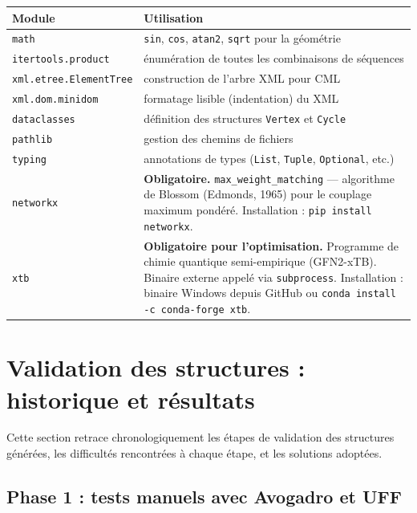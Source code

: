 \documentclass[a4paper,12pt]{article}
\begin{document}
\begin{center}
\begin{tabular}{lp{9cm}}
  \toprule
  Module & Utilisation \\
  \midrule
  \texttt{math} & \texttt{sin}, \texttt{cos}, \texttt{atan2}, \texttt{sqrt} pour la géométrie \\
  \texttt{itertools.product} & énumération de toutes les combinaisons de séquences \\
  \texttt{xml.etree.ElementTree} & construction de l'arbre XML pour CML \\
  \texttt{xml.dom.minidom} & formatage lisible (indentation) du XML \\
  \texttt{dataclasses} & définition des structures \texttt{Vertex} et \texttt{Cycle} \\
  \texttt{pathlib} & gestion des chemins de fichiers \\
  \texttt{typing} & annotations de types (\texttt{List}, \texttt{Tuple}, \texttt{Optional}, etc.) \\
  \midrule
  \texttt{networkx} & \textbf{Obligatoire.} \texttt{max\_weight\_matching} — algorithme de
    Blossom (Edmonds, 1965) pour le couplage maximum pondéré.
    Installation : \texttt{pip install networkx}. \\
  \texttt{xtb} & \textbf{Obligatoire pour l'optimisation.} Programme de chimie quantique
    semi-empirique (GFN2-xTB). Binaire externe appelé via \texttt{subprocess}.
    Installation : binaire Windows depuis GitHub ou \texttt{conda install -c conda-forge xtb}. \\
  \bottomrule
\end{tabular}
\end{center}

\section{Validation des structures : historique et résultats}

Cette section retrace chronologiquement les étapes de validation des structures générées,
les difficultés rencontrées à chaque étape, et les solutions adoptées.

\subsection{Phase 1 : tests manuels avec Avogadro et UFF}
\end{document}
